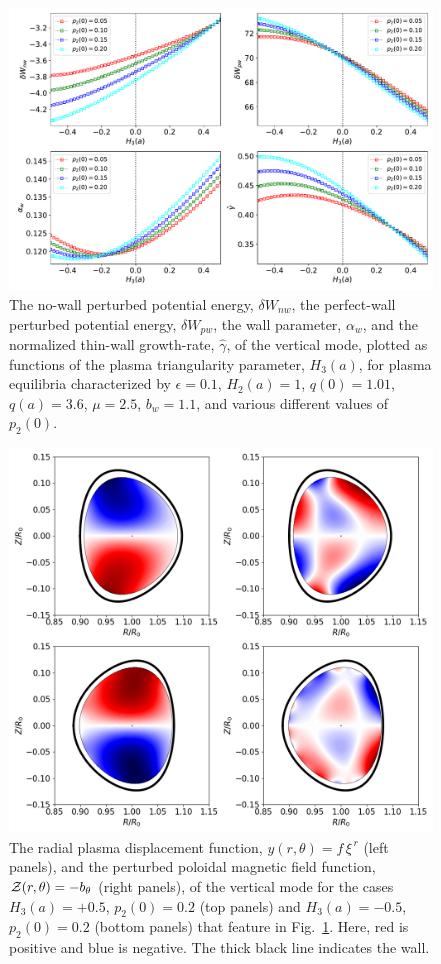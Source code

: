 \documentclass[12pt,prb,aps]{revtex4-1}
\begin{document}
\begin{figure}
\centerline{\includegraphics[width=\textwidth]{Fig4.pdf}}
\caption{The no-wall perturbed potential energy, $\delta W_{nw}$, the perfect-wall perturbed potential energy, $\delta W_{pw}$, the wall
parameter, $\alpha_w$, and the normalized thin-wall growth-rate, $\hat{\gamma}$,  of the  vertical  mode, plotted as  functions of the
plasma triangularity parameter, $H_3(a)$, for plasma equilibria characterized by  $\epsilon=0.1$, $H_2(a)=1$, $q(0)=1.01$, $q(a)=3.6$,  $\mu=2.5$, $b_w=1.1$, and
various different values of $p_2(0)$.  \label{fig4}}
\end{figure}

\newpage
\begin{figure}
\centerline{\includegraphics[width=\textwidth]{Fig5.png}}
\caption{The radial plasma displacement function, $y(r,\theta)=f\,\xi^{\,r}$ (left panels),  and the perturbed poloidal magnetic
field function, ${\cal Z}(r,\theta)= - b_\theta$ (right panels), of the vertical mode for the cases $H_3(a)=+0.5$, $p_2(0)=0.2$ (top panels) and $H_3(a)=-0.5$, $p_2(0)=0.2$  (bottom panels) that feature in Fig.~\ref{fig4}.
Here, red is positive and blue is negative. The thick black line indicates the wall. \label{fig5}}
\end{figure}
\end{document}
